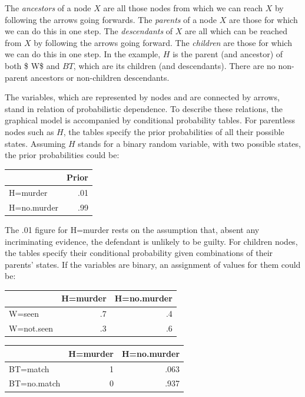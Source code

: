 \documentclass[11pt,dvipsnames,enabledeprecatedfontcommands]{scrartcl}
\begin{document}
The \emph{ancestors} of a node \(X\) are all those nodes from which we
can reach \(X\) by following the arrows going forwards. The
\textit{parents} of a node \(X\) are those for which we can do this in
one step. The \textit{descendants} of \(X\) are all which can be reached
from \(X\) by following the arrows going forward. The \textit{children}
are those for which we can do this in one step. In the example, \(H\) is
the parent (and ancestor) of both \$ W\$ and \(BT\), which are its
children (and descendants). There are no non-parent ancestors or
non-children descendants.

The variables, which are represented by nodes and are connected by
arrows, stand in relation of probabilistic dependence. To describe these
relations, the graphical model is accompanied by conditional probability
tables. For parentless nodes such as \(H\), the tables specify the prior
probabilities of all their possible states. Assuming \(H\) stands for a
binary random variable, with two possible states, the prior
probabilities could be:

\begin{table}[H]
\centering
\begin{tabular}{lr}
\toprule
  & Prior\\
\midrule
H=murder & .01\\
H=no.murder & .99\\
\bottomrule
\end{tabular}
\end{table}

\noindent The .01 figure for H=murder rests on the assumption that,
absent any incriminating evidence, the defendant is unlikely to be
guilty. For children nodes, the tables specify their conditional
probability given combinations of their parents' states. If the
variables are binary, an assignment of values for them could be:

\begin{table}[H]
\centering
\begin{tabular}{lrr}
\toprule
  & H=murder & H=no.murder\\
\midrule
W=seen & .7 & .4\\
W=not.seen & .3 & .6\\
\bottomrule
\end{tabular}
\end{table}

\begin{table}[H]
\centering
\begin{tabular}{lrr}
\toprule
  & H=murder & H=no.murder\\
\midrule
BT=match & 1 & .063\\
BT=no.match & 0 & .937\\
\bottomrule
\end{tabular}
\end{table}
\end{document}
